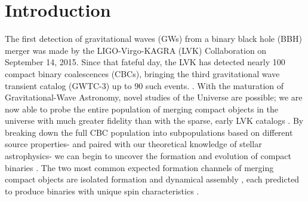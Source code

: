 \section{Introduction} \label{sec:intro}

The first detection of gravitational waves (GWs) from a binary black hole (BBH) merger was made by the LIGO-Virgo-KAGRA (LVK) Collaboration on September 14, 2015. Since that fateful day, the LVK has detected nearly 100 compact binary coalescences (CBCs), bringing the third gravitational wave transient catalog (GWTC-3) up to 90 such events. \citep{2015CQGra..32g4001L,2015CQGra..32b4001A,2021PTEP.2021eA102A,2016PhRvL.116f1102A,2019PhRvX...9c1040A,2021PhRvX..11b1053A,2021arXiv211103606T}. With the maturation of Gravitational-Wave Astronomy, novel studies of the Universe are possible; we are now able to probe the entire population of merging compact objects in the universe with much greater fidelity than with the sparse, early LVK catalogs \citep{2019ApJ...882L..24A,2021ApJ...913L...7A,2021arXiv211103634T}. By breaking down the full CBC population into subpopulations based on different source properties- and paired with our theoretical knowledge of stellar astrophysics- we can begin to uncover the formation and evolution of compact binaries \citep{2017ApJ...846...82Z}. The two most common expected formation channels of merging compact objects are isolated formation and dynamical assembly \citep[][and references therein]{10.3847/1538-4357/ab88b2} , each predicted to produce binaries with unique spin characteristics \citep{2017Natur.548..426F,2018ApJ...854L...9F}.

